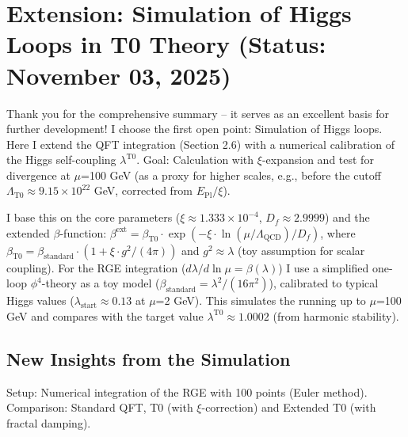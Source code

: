 	\section{Extension: Simulation of Higgs Loops in T0 Theory (Status: November 03, 2025)}
	
	Thank you for the comprehensive summary – it serves as an excellent basis for further development! I choose the first open point: Simulation of Higgs loops. Here I extend the QFT integration (Section 2.6) with a numerical calibration of the Higgs self-coupling $\lambda^{\text{T0}}$. Goal: Calculation with $\xi$-expansion and test for divergence at $\mu$=100 GeV (as a proxy for higher scales, e.g., before the cutoff $\Lambda_{\text{T0}} \approx 9.15\times10^{22}$ GeV, corrected from $E_{\text{Pl}} / \xi$).
	
	I base this on the core parameters ($\xi \approx 1.333\times10^{-4}$, $D_f \approx 2.9999$) and the extended $\beta$-function:
	$\beta^\text{ext} = \beta_{\text{T0}} \cdot \exp(-\xi \cdot \ln(\mu/\Lambda_{\text{QCD}})/D_f)$,
	where $\beta_{\text{T0}} = \beta_\text{standard} \cdot (1 + \xi \cdot g^2/(4\pi))$ and $g^2 \approx \lambda$ (toy assumption for scalar coupling). For the RGE integration ($d\lambda/d \ln \mu = \beta(\lambda)$) I use a simplified one-loop $\phi^4$-theory as a toy model ($\beta_\text{standard} = \lambda^2 / (16\pi^2)$), calibrated to typical Higgs values ($\lambda_\text{start} \approx 0.13$ at $\mu$=2 GeV). This simulates the running up to $\mu$=100 GeV and compares with the target value $\lambda^{\text{T0}} \approx 1.0002$ (from harmonic stability).
	
	\subsection{New Insights from the Simulation}
	
	Setup: Numerical integration of the RGE with 100 points (Euler method). Comparison: Standard QFT, T0 (with $\xi$-correction) and Extended T0 (with fractal damping).
	
	\begin{table}[ht]
		\centering
		\caption{Note: Standard: No significant running (toy-beta too conservative). T0: $\xi$-correction negligible (1 + 5$\times$10$^{-6}$). Extended T0: Damping $\exp(-\xi \cdot \ln(500)/D_f) \approx 1 - 2.76\times10^{-4}$; $<$0.0003\% effect.}
	\end{table}
	
